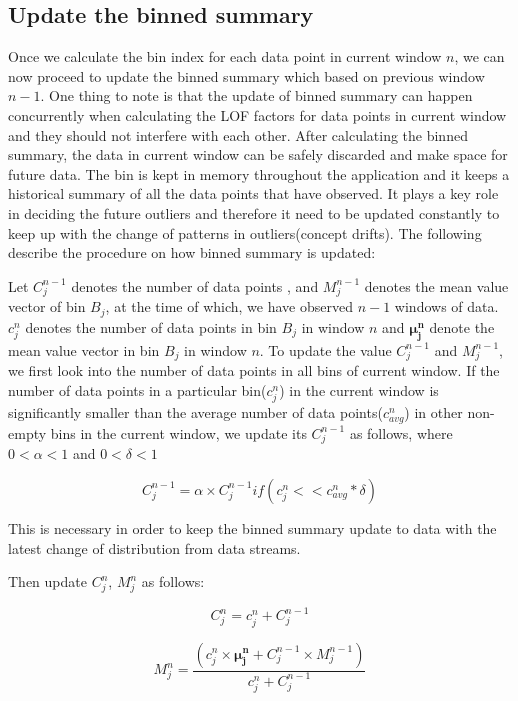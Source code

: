 \documentclass[11pt]{article}       %
\begin{document}
\subsection{Update the binned summary} \label{subsect4}

Once we calculate the bin index for each data point in current window $n$, we can now proceed to update the binned summary which based on previous window $n-1$. One thing to note is that the update of binned summary can happen concurrently when calculating the LOF factors for data points in current window and they should not interfere with each other. After calculating the binned summary, the data in current window can be safely discarded and make space for future data. The bin is kept in memory throughout the application and it keeps a historical summary of all the data points that have observed. It plays a key role in deciding the future outliers and therefore it need to be updated constantly to keep up with the change of patterns in outliers(concept drifts). The following describe the procedure on how binned summary is updated:

Let $C_{j}^{n-1}$ denotes the number of data points , and $M_{j}^{n-1}$ denotes the mean value vector of bin $B_j$, at the time of which, we have observed $n-1$ windows of data. $c_{j}^{n}$ denotes the number of data points in bin $B_j$ in window $n$ and $\mathbf{\mu_j^n}$ denote the mean value vector in bin $B_j$ in window $n$. To update the value $C_{j}^{n-1}$ and $M_{j}^{n-1}$, we first look into the number of data points in all bins of current window. If the number of data points in a particular bin($c_{j}^{n}$) in the current window is significantly smaller than the average number of data points($c_{avg}^{n}$) in other non-empty bins in the current window, we update its $C_{j}^{n-1}$ as follows, where $0 < \alpha < 1$ and $0 < \delta < 1$  

\[ C_{j}^{n-1} = \alpha \times C_{j}^{n-1}  if(c_{j}^{n} << c_{avg}^{n} * \delta)   \] 

This is necessary in order to keep the binned summary update to data with the latest change of distribution from data streams.

Then update $C_j^n$, $M_j^n$ as follows:

\[ C_j^n = c_j^n + C_j^{n-1} \]

\[ M_j^n = \frac{(c_j^n \times \mathbf{\mu_j^n} + C_j^{n-1} \times M_j^{n - 1} )}{ c_j^n + C_j^{n-1} } \]
\end{document}
